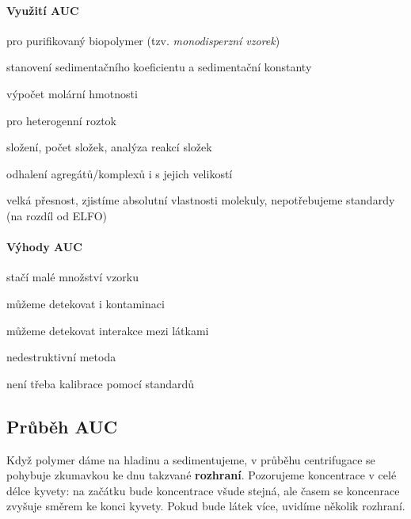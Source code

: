 \documentclass[DIV=8]{scrreprt}
\begin{document}
\paragraph{Využití AUC}
\begin{myItemize}[nosep]
    \item pro purifikovaný biopolymer (tzv. \emph{monodisperzní vzorek})
\begin{myItemize}[nosep]
    \item stanovení sedimentačního koeficientu a sedimentační konstanty
    \item výpočet molární hmotnosti
\end{myItemize}

    \item pro heterogenní roztok
\begin{myItemize}[nosep]
    \item složení, počet složek, analýza reakcí složek
    \item odhalení agregátů/komplexů i s jejich velikostí
\end{myItemize}

    \item velká přesnost, zjistíme absolutní vlastnosti molekuly, nepotřebujeme standardy (na rozdíl od ELFO)
\end{myItemize}



\paragraph{Výhody AUC}
\begin{myItemize}[nosep]
    \item stačí malé množství vzorku
    \item můžeme detekovat i kontaminaci
    \item můžeme detekovat interakce mezi látkami
    \item nedestruktivní metoda
    \item není třeba kalibrace pomocí standardů
\end{myItemize}



\subsection{Průběh AUC} \label{Průběh AUC}


Když polymer dáme na hladinu a sedimentujeme, v průběhu centrifugace se pohybuje zkumavkou ke dnu takzvané \textbf{rozhraní}. Pozorujeme koncentrace v celé délce kyvety: na začátku bude koncentrace všude stejná, ale časem se koncenrace zvyšuje směrem ke konci kyvety. Pokud bude látek více, uvidíme několik rozhraní.
\end{document}
